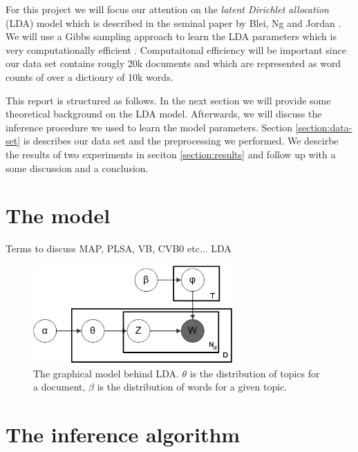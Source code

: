 \documentclass[11pt]{article}
\begin{document}
    For this project we will focus our attention on the \emph{latent Dirichlet allocation} (LDA) model
    which is described in the seminal paper by Blei, Ng and Jordan \cite{Blei2003}. 
    We will use a Gibbs sampling approach to learn the LDA parameters which is very computationally
    efficient \cite{griffiths2004finding}. 
    Computaitonal efficiency will be important since our data set contains rougly 20k documents and 
    which are represented as word counts of over a dictionry of 10k words.
    
    This report is structured as follows.
    In the next section we will provide some theoretical background on the LDA model.
    Afterwards, we will discuss the inference procedure we used to learn the model parameters.
    Section \ref{section:data-set} is describes our data set and the preprocessing we performed.
    We descirbe the results of two experiments in seciton \ref{section:results} and follow up
    with a some discussion and a conclusion.



\section{The model}

    Terms to discuss MAP, PLSA, VB, CVB0 etc...
    LDA 
    \begin{figure}[htb]
    \begin{center}
    \includegraphics[width=3in]{lda-diagram.png}  %
    \caption{ The graphical model behind LDA. $\theta$ is the distribution  of topics for a document,
              $\beta$ is the distribution of words for a given topic.}
    \end{center}
    \end{figure}


\section{The inference algorithm}
\end{document}
